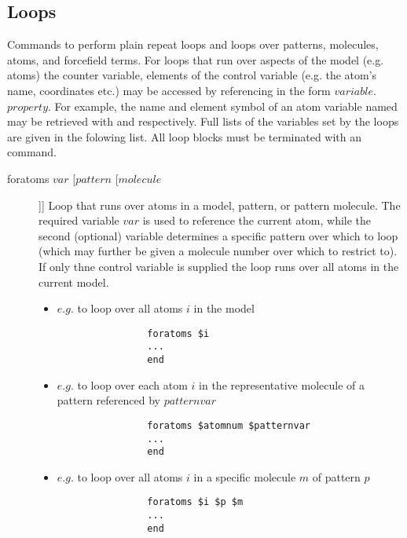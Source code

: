 \subsection{Loops}
Commands to perform plain repeat loops and loops over patterns, molecules, atoms, and forcefield terms. For loops that run over aspects of the model (e.g. atoms) the counter variable, elements of the control variable (e.g. the atom's name, coordinates etc.) may be accessed by referencing in the form $variable$.$property$. For example, the name and element symbol of an atom variable named  may be retrieved with  and  respectively. Full lists of the variables set by the loops are given in the folowing list. All loop blocks must be terminated with an  command.
\begin{description}

	\item[foratoms $var$ [$pattern$ [$molecule$]]\its]
		Loop that runs over atoms in a model, pattern, or pattern molecule. The required variable $var$ is used to reference the current atom, while the second (optional) variable determines a specific pattern over which to loop (which may further be given a molecule number over which to restrict to). If only thne control variable is supplied the loop runs over all atoms in the current model.

		\begin{itemize}
			\item $e.g.$ to loop over all atoms $i$ in the model
			\begin{verbatim}
				foratoms $i
				...
				end
			\end{verbatim}

			\item $e.g.$ to loop over each atom $i$ in the representative molecule of a pattern referenced by $patternvar$
			\begin{verbatim}
				foratoms $atomnum $patternvar
				...
				end
			\end{verbatim}

			\item $e.g.$ to loop over all atoms $i$ in a specific molecule $m$ of pattern $p$
			\begin{verbatim}
				foratoms $i $p $m
				...
				end
			\end{verbatim}


\end{itemize}
\end{description}
